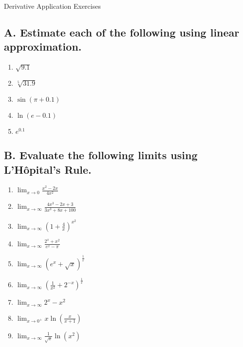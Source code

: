 \documentclass{article}
\begin{document}
\begin{center}
\begin{Huge}Derivative Application Exercises\end{Huge}
\end{center}
\subsection*{A. Estimate each of the following using linear approximation.}

\begin{multicols}{5}
\begin{enumerate}
\item $\sqrt{9.1}$
\item $\sqrt[5]{31.9}$
\item $\sin(\pi + 0.1)$
\item $\ln(e-0.1)$
\item $e^{0.1}$
\end{enumerate}
\end{multicols}







\subsection*{B. Evaluate the following limits using L’H\^opital’s Rule.}
\begin{multicols}{3}
\begin{enumerate}
    \item $\displaystyle\lim_{x\to 0}\frac{x^2-2x}{4x^2}$
    \item $\displaystyle\lim_{x\to\infty}\frac{4x^3-2x+3}{3x^3+8x+100}$
    \item $\displaystyle\lim_{x\to \infty}\left(1 + \frac{4}{x}\right)^{x^2}$
    \item $\displaystyle\lim_{x\to\infty}\frac{2^x+x^2}{e^x-\pi}$
    \item $\displaystyle\lim_{x\to\infty}\left(e^{x}+\sqrt{x}\right)^{\frac{1}{x}}$
    \item $\displaystyle\lim_{x\to\infty}\left(\frac{1}{x^2}+2^{-x}\right)^{\frac{1}{x}}$
    \item $\displaystyle\lim_{x\to\infty}2^{x}-x^{2}$
    \item $\displaystyle \lim_{x\to0^+}x\ln\left(\frac{x}{x+1}\right)$
    \item $\displaystyle \lim_{x\to\infty}\frac{1}{\sqrt{x}}\ln\left(x^2\right)$
\end{enumerate}
\end{multicols}
\end{document}
